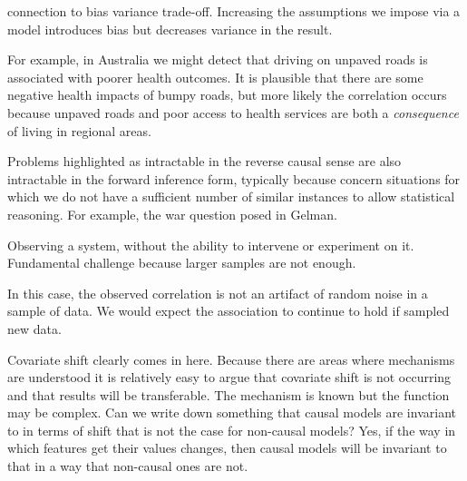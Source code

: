 connection to bias variance trade-off. Increasing the assumptions we impose via a model introduces bias but decreases variance in the result.


For example, in Australia we might detect that driving on unpaved roads is associated with poorer health outcomes. It is plausible that there are some negative health impacts of bumpy roads, but more likely the correlation occurs because unpaved roads and poor access to health services are both a \emph{consequence} of living in regional areas.


Problems highlighted as intractable in the reverse causal sense are also intractable in the forward inference form, typically because concern situations for which we do not have a sufficient number of similar instances to allow statistical reasoning. For example, the war question posed in Gelman. 


Observing a system, without the ability to intervene or experiment on it. Fundamental challenge because larger samples are not enough. 


In this case, the observed correlation is not an artifact of random noise in a sample of data. We would expect the association to continue to hold if sampled new data. 

 Covariate shift clearly comes in here. Because there are areas where mechanisms are understood it is relatively easy to argue that covariate shift is not occurring and that results will be transferable. The mechanism is known but the function may be complex. Can we write down something that causal models are invariant to in terms of shift that is not the case for non-causal models? Yes, if the way in which features get their values changes, then causal models will be invariant to that in a way that non-causal ones are not. 


